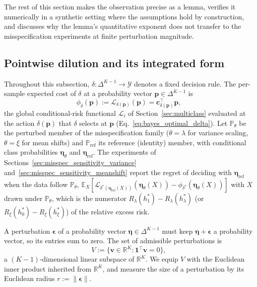 The rest of this section makes the observation precise as a lemma, verifies it numerically in a synthetic setting where the assumptions hold by construction, and discusses why the lemma's quantitative exponent does not transfer to the misspecification experiments at finite perturbation magnitude.

\subsection{Pointwise dilution and its integrated form}\label{sec:misspec_sensitivity_lemma}

Throughout this subsection, $\delta : \Delta^{K-1} \to \mathcal{Y}$ denotes a fixed decision rule. The per-sample expected cost of $\delta$ at a probability vector $\mathbf{p} \in \Delta^{K-1}$ is
\begin{equation}\label{eq:per_sample_cost_functional}
    \phi_\delta(\mathbf{p}) := \mathcal{L}_{\delta(\mathbf{p})}(\mathbf{p}) = \mathbf{c}_{\delta(\mathbf{p})}^\top \mathbf{p},
\end{equation}
the global conditional-risk functional $\mathcal{L}_i$ of Section~\ref{sec:multiclass} evaluated at the action $\delta(\mathbf{p})$ that $\delta$ selects at $\mathbf{p}$ (Eq.~\eqref{eq:bayes_optimal_delta}). Let $\mathbb{P}_\theta$ be the perturbed member of the misspecification family ($\theta = \lambda$ for variance scaling, $\theta = \xi$ for mean shifts) and $\mathbb{P}_{\mathrm{ref}}$ its reference (identity) member, with conditional class probabilities $\boldsymbol{\eta}_\theta$ and $\boldsymbol{\eta}_{\mathrm{ref}}$. The experiments of Sections~\ref{sec:misspec_sensitivity_variance} and~\ref{sec:misspec_sensitivity_meanshift} report the regret of deciding with $\boldsymbol{\eta}_{\mathrm{ref}}$ when the data follow $\mathbb{P}_\theta$, $\mathbb{E}_X[\mathcal{L}_{\delta^*(\boldsymbol{\eta}_{\mathrm{ref}}(X))}(\boldsymbol{\eta}_\theta(X)) - \phi_{\delta^*}(\boldsymbol{\eta}_\theta(X))]$ with $X$ drawn under $\mathbb{P}_\theta$, which is the numerator $R_\lambda(h^*_1) - R_\lambda(h^*_\lambda)$ (or $R_\xi(h^*_0) - R_\xi(h^*_\xi)$) of the relative excess risk.

A perturbation $\boldsymbol{\epsilon}$ of a probability vector $\boldsymbol{\eta} \in \Delta^{K-1}$ must keep $\boldsymbol{\eta} + \boldsymbol{\epsilon}$ a probability vector, so its entries sum to zero. The set of admissible perturbations is
\begin{equation}\label{eq:perturbation_space}
    V := \{ \mathbf{v} \in \mathbb{R}^K : \mathbf{1}^\top \mathbf{v} = 0 \},
\end{equation}
a $(K-1)$-dimensional linear subspace of $\mathbb{R}^K$. We equip $V$ with the Euclidean inner product inherited from $\mathbb{R}^K$, and measure the size of a perturbation by its Euclidean radius $r := \|\boldsymbol{\epsilon}\|$.

